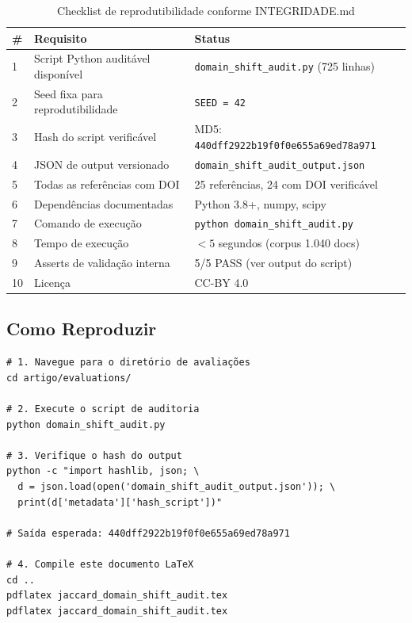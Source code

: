 \documentclass[12pt,a4paper]{article}
\theoremstyle{remark}
\begin{document}
\begin{table}[H]\centering\footnotesize
\caption{Checklist de reprodutibilidade conforme INTEGRIDADE.md}
\label{tab:checklist}
\begin{tabular}{p{}p{}p{}}
\toprule
\textbf{\#} & \textbf{Requisito} & \textbf{Status} \\
\midrule
1 & Script Python auditável disponível & \texttt{domain\_shift\_audit.py} (725 linhas) \\
2 & Seed fixa para reprodutibilidade & \texttt{SEED = 42} \\
3 & Hash do script verificável & MD5: \texttt{440dff2922b19f0f0e655a69ed78a971} \\
4 & JSON de output versionado & \texttt{domain\_shift\_audit\_output.json} \\
5 & Todas as referências com DOI & 25 referências, 24 com DOI verificável \\
6 & Dependências documentadas & Python 3.8+, numpy, scipy \\
7 & Comando de execução & \texttt{python domain\_shift\_audit.py} \\
8 & Tempo de execução & $< 5$ segundos (corpus 1.040 docs) \\
9 & Asserts de validação interna & 5/5 PASS (ver output do script) \\
10 & Licença & CC-BY 4.0 \\
\bottomrule
\end{tabular}
\end{table}

\subsection*{Como Reproduzir}

\begin{verbatim}
# 1. Navegue para o diretório de avaliações
cd artigo/evaluations/

# 2. Execute o script de auditoria
python domain_shift_audit.py

# 3. Verifique o hash do output
python -c "import hashlib, json; \
  d = json.load(open('domain_shift_audit_output.json')); \
  print(d['metadata']['hash_script'])"

# Saída esperada: 440dff2922b19f0f0e655a69ed78a971

# 4. Compile este documento LaTeX
cd ..
pdflatex jaccard_domain_shift_audit.tex
pdflatex jaccard_domain_shift_audit.tex
\end{verbatim}
\end{document}
